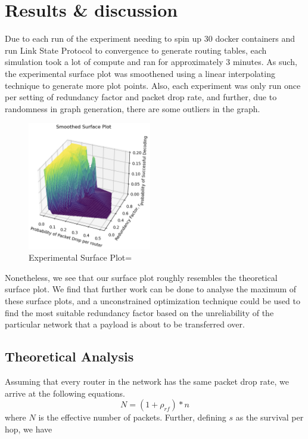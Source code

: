\section{Results \& discussion}
\label{sec:resul}
Due to each run of the experiment needing to spin up 30 docker containers and run Link State Protocol to convergence to generate routing tables,
each simulation took a lot of compute and ran for approximately 3 minutes. As such, the experimental surface plot was smoothened using a linear interpolating technique
to generate more plot points. Also, each experiment was only run once per setting of redundancy factor and packet drop rate, and further, due to randomness in graph generation, there are some 
outliers in the graph. 

\begin{figure}[ht]
    \includegraphics[width=0.48\textwidth]{experimental.png}  %
    \caption{Experimental Surface Plot=}  %
\end{figure}

Nonetheless, we see that our surface plot roughly resembles the theoretical surface plot. We find that further work can be done to analyse the 
maximum of these surface plots, and a unconstrained optimization technique could be used to find the most suitable redundancy factor based on the unreliability of the particular network 
that a payload is about to be transferred over. 


\subsection{Theoretical Analysis}
Assuming that every router in the network has the same packet drop rate, we arrive at the following equations.
\begin{equation} \label{eq: yPlus}
    N = (1+\rho_{rf})*n
\end{equation}
where $N$ is the effective number of packets.
Further, defining $s$ as the survival per hop, we have 

